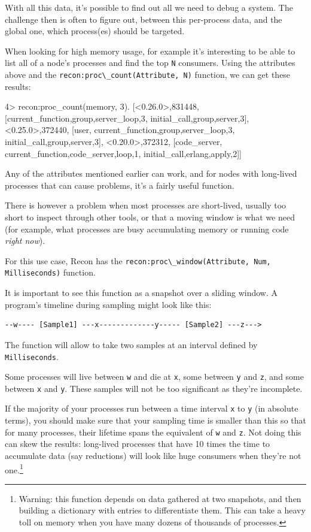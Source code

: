 \documentclass[11pt, oneside]{book}   	%
\newcommand{\function}[1]{\Verb`#1`}
\newcommand{\var}[1]{\Verb`#1`}
\begin{document}
With all this data, it's possible to find out all we need to debug a system. The challenge then is often to figure out, between this per-process data, and the global one, which process(es) should be targeted.

When looking for high memory usage, for example it's interesting to be able to list all of a node's processes and find the top \var{N} consumers. Using the attributes above and the \function{recon:proc\_count(Attribute, N)} function, we can get these results:

\begin{VerbatimEshell}
4> recon:proc_count(memory, 3).
[{<0.26.0>,831448,
  [{current_function,{group,server_loop,3}},
   {initial_call,{group,server,3}}]},
 {<0.25.0>,372440,
  [user,
   {current_function,{group,server_loop,3}},
   {initial_call,{group,server,3}}]},
 {<0.20.0>,372312,
  [code_server,
   {current_function,{code_server,loop,1}},
   {initial_call,{erlang,apply,2}}]}]
\end{VerbatimEshell}

Any of the attributes mentioned earlier can work, and for nodes with long-lived processes that can cause problems, it's a fairly useful function.

There is however a problem when most processes are short-lived, usually too short to inspect through other tools, or that a moving window is what we need (for example, what processes are busy accumulating memory or running code \emph{right now}).

For this use case, Recon has the \function{recon:proc\_window(Attribute, Num, Milliseconds)} function.

It is important to see this function as a snapshot over a sliding window. A program's timeline during sampling might look like this:

\begin{Verbatim}
--w---- [Sample1] ---x-------------y----- [Sample2] ---z--->
\end{Verbatim}

The function will allow to take two samples at an interval defined by \var{Milliseconds}.

Some processes will live between \var{w} and die at \var{x}, some between \var{y} and \var{z}, and some between \var{x} and \var{y}. These samples will not be too significant as they're incomplete.

If the majority of your processes run between a time interval \var{x} to \var{y} (in absolute terms), you should make sure that your sampling time is smaller than this so that for many processes, their lifetime spans the equivalent of \var{w} and \var{z}. Not doing this can skew the results: long-lived processes that have 10 times the time to accumulate data (say reductions) will look like huge consumers when they're not one.\footnote{Warning: this function depends on data gathered at two snapshots, and then building a dictionary with entries to differentiate them. This can take a heavy toll on memory when you have many dozens of thousands of processes.}
\end{document}
